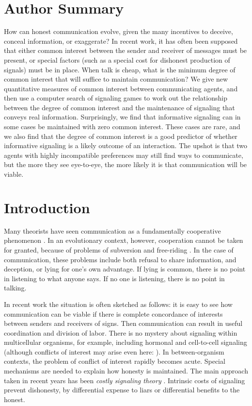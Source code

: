 \documentclass[10pt]{article}
\begin{document}
\section*{Author Summary}

How can honest communication evolve, given the many incentives to
deceive, conceal information, or exaggerate? In recent work, it has
often been supposed that either common interest between the sender and
receiver of messages must be present, or special factors (such as a
special cost for dishonest production of signals) must be in place. When
talk is cheap, what is the minimum degree of common interest that will
suffice to maintain communication? We give new quantitative measures of common interest between
communicating agents, and then use a computer search of signaling games
to work out the relationship between the degree of common interest and
the maintenance of signaling that conveys real information.
Surprisingly, we find that informative signaling can in some cases be
maintained with zero common interest. These cases are rare, and we also
find that the degree of common interest is a good predictor of whether
informative signaling is a likely outcome of an interaction. The upshot is that two agents with highly incompatible preferences may
still find ways to communicate, but the more they see eye-to-eye, the
more likely it is that communication will be viable.

\section*{Introduction}

Many theorists have seen communication as a fundamentally cooperative
phenomenon \cite{Lewis1969, Grice1975, Millikan84, Tomasello2008}. In
an evolutionary context, however, cooperation cannot be taken for
granted, because of problems of subversion and free-riding
\cite{Williams1966}. In the case of communication, these problems
include both refusal to share information, and deception, or lying for
one's own advantage. If lying is common, there is no point in listening
to what anyone says. If no one is listening, there is no point in
talking.

In recent work the situation is often sketched as follows: it is easy to
see how communication can be viable if there is complete concordance of
interests between senders and receivers of signs. Then communication can
result in useful coordination and division of labor. There is no mystery
about signaling within multicellular organisms, for example, including
hormonal and cell-to-cell signaling (although conflicts of interest may
arise even here: \cite{Haig2008}). In between-organism contexts, the
problem of conflict of interest rapidly becomes acute. Special
mechanisms are needed to explain how honesty is maintained. The main
approach taken in recent years has been \emph{costly signaling theory}
\cite{Zahavi1975, Grafen1990, Maynard-Smith2003}. Intrinsic costs of
signaling prevent dishonesty, by differential expense to liars or
differential benefits to the honest.
\end{document}
